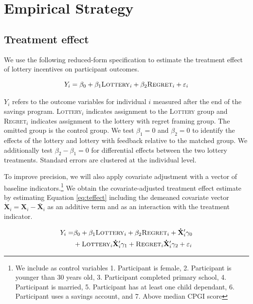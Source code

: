 \documentclass[11pt]{article}
\begin{document}
		

		\clearpage

		

\section{Empirical Strategy} \label{sec:est}

	\subsection{Treatment effect}

		We use the following reduced-form specification to estimate the treatment effect of lottery incentives on participant outcomes.

		\begin{equation} \label{eq:teffect}
			Y_{i} = \beta_{0} + \beta_{1}\text{\textsc{Lottery}}_{i} + \beta_{2}\text{\textsc{Regret}}_{i} + \varepsilon_{i}
		\end{equation}

		$Y_{i}$ refers to the outcome variables for individual $i$ measured after the end of the savings program. \textsc{Lottery}$_i$ indicates assignment to the \textsc{Lottery} group and \textsc{Regret}$_i$ indicates assignment to the lottery with regret framing group. The omitted group is the control group. We test $\beta_{1} = 0$ and $\beta_{2} = 0$ to identify the effects of the lottery and lottery with feedback relative to the matched group. We additionally test $\beta_{2} - \beta_{1} = 0$ for differential effects between the two lottery treatments. Standard errors are clustered at the individual level.

		To improve precision, we will also apply covariate adjustment with a vector of baseline indicators.\footnote{We include as control variables 1. Participant is female, 2. Participant is younger than 30 years old, 3. Participant completed primary school, 4. Participant is married, 5. Participant has at least one child dependant, 6. Participant uses a savings account, and 7. Above median CPGI score} We obtain the covariate-adjusted treatment effect estimate by estimating Equation \ref{eq:teffect} including the demeaned covariate vector $\mathbf{\dot X}_{i} = \mathbf{X}_{i} - \mathbf{\bar X}_{i}$ as an additive term and as an interaction with the treatment indicator.

		\begin{equation} \begin{split} \label{eq:controls}
			Y_{i} = & \beta_{0} + \beta_{1}\text{\textsc{Lottery}}_{i} + \beta_{2}\text{\textsc{Regret}}_{i} + \mathbf{\dot X}'_i \gamma_{0} \\
					& + \text{\textsc{Lottery}}_{i} \mathbf{\dot X}'_i \gamma_{1} + \text{\textsc{Regret}}_{i} \mathbf{\dot X}'_i \gamma_{2} + \varepsilon_{i}
		\end{split} \end{equation}
\end{document}
